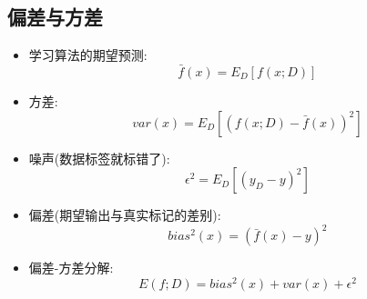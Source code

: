 \documentclass[UTF8]{article}
\begin{document}
\subsection{偏差与方差}
\begin{itemize}
\item 学习算法的期望预测:$$\bar{f}(x)=E_D[f(x;D)]$$
\item 方差: $$var(x)=E_D\left[(f(x;D)-\bar{f}(x))^2\right]$$
\item 噪声(数据标签就标错了): $$\epsilon^2=E_D\left[(y_D-y)^2\right]$$
\item 偏差(期望输出与真实标记的差别):$$bias^2(x)=(\bar{f}(x)-y)^2$$
\item 偏差-方差分解:$$E(f;D)=bias^2(x)+var(x)+\epsilon^2$$
\end{itemize}
\end{document}
